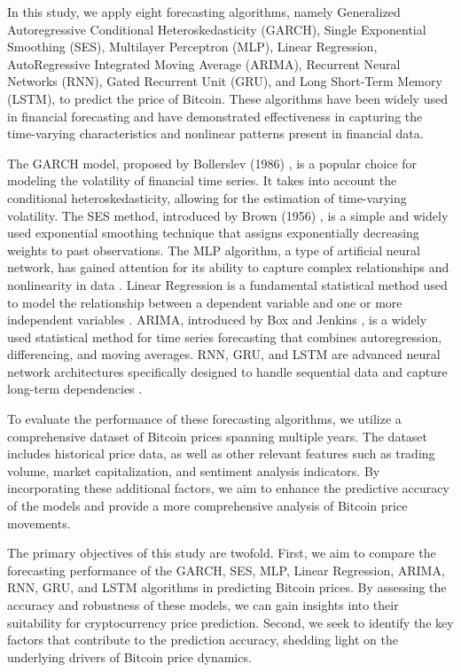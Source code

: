 \documentclass{ieeeojies}
\begin{document}
\noindent In this study, we apply eight forecasting algorithms, namely Generalized Autoregressive Conditional Heteroskedasticity (GARCH),
Single Exponential Smoothing (SES), Multilayer Perceptron (MLP), Linear Regression, AutoRegressive Integrated Moving Average (ARIMA),
Recurrent Neural Networks (RNN), Gated Recurrent Unit (GRU), and Long Short-Term Memory (LSTM), to predict the price of Bitcoin.
These algorithms have been widely used in financial forecasting and have demonstrated effectiveness in capturing
the time-varying characteristics and nonlinear patterns present in financial data.

\noindent The GARCH model, proposed by Bollerslev (1986) \cite{b1}, is a popular choice for modeling the volatility of financial time series. It takes into
account the conditional heteroskedasticity, allowing for the estimation of time-varying volatility. The SES method, introduced by Brown (1956) \cite{b2},
is a simple and widely used exponential smoothing technique that assigns exponentially decreasing weights to past observations. The MLP algorithm, a type of
artificial neural network, has gained attention for its ability to capture complex relationships and nonlinearity in data \cite{b7}. Linear Regression is
a fundamental statistical method used to model the relationship between a dependent variable and one or more independent variables \cite{b10}. ARIMA,
introduced by Box and Jenkins \cite{b8}, is a widely used statistical method for time series forecasting that combines autoregression, differencing,
and moving averages. RNN, GRU, and LSTM are advanced neural network architectures specifically designed to handle sequential data and
capture long-term dependencies \cite{b9}.

\noindent To evaluate the performance of these forecasting algorithms, we utilize a comprehensive dataset of Bitcoin prices spanning multiple years.
The dataset includes historical price data, as well as other relevant features such as trading volume, market capitalization, and sentiment analysis indicators.
By incorporating these additional factors, we aim to enhance the predictive accuracy of the models and provide a more comprehensive analysis of Bitcoin price movements.

\noindent The primary objectives of this study are twofold. First, we aim to compare the forecasting performance of the GARCH, SES, MLP, Linear Regression,
ARIMA, RNN, GRU, and LSTM algorithms in predicting Bitcoin prices. By assessing the accuracy and robustness of these models, we can gain insights into
their suitability for cryptocurrency price prediction. Second, we seek to identify the key factors that contribute to the prediction accuracy, shedding light
on the underlying drivers of Bitcoin price dynamics.
\end{document}
